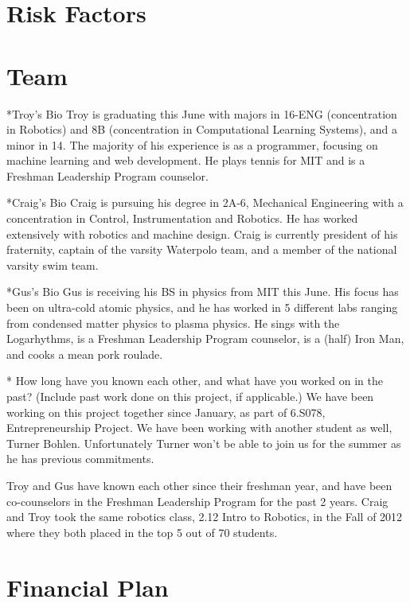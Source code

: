 \documentclass{article}
\begin{document}
\section{Risk Factors}

\section{Team}
*Troy's Bio Troy is graduating this June with majors in 16-ENG (concentration in
Robotics) and 8B (concentration in Computational Learning Systems), and a minor
in 14. The majority of his experience is as a programmer, focusing on machine
learning and web development. He plays tennis for MIT and is a Freshman
Leadership Program counselor.

*Craig's Bio Craig is pursuing his degree in 2A-6, Mechanical Engineering with a
concentration in Control, Instrumentation and Robotics. He has worked
extensively with robotics and machine design. Craig is currently president of
his fraternity, captain of the varsity Waterpolo team, and a member of the
national varsity swim team.

*Gus's Bio Gus is receiving his BS in physics from MIT this June. His focus has
been on ultra-cold atomic physics, and he has worked in 5 different labs ranging
from condensed matter physics to plasma physics. He sings with the Logarhythms,
is a Freshman Leadership Program counselor, is a (half) Iron Man, and cooks a
mean pork roulade.

* How long have you known each other, and what have you worked on in the past?
(Include past work done on this project, if applicable.) We have been working on
this project together since January, as part of 6.S078, Entrepreneurship
Project. We have been working with another student as well, Turner Bohlen.
Unfortunately Turner won't be able to join us for the summer as he has previous
commitments.

Troy and Gus have known each other since their freshman year, and have been
co-counselors in the Freshman Leadership Program for the past 2 years. Craig and
Troy took the same robotics class, 2.12 Intro to Robotics, in the Fall of 2012
where they both placed in the top 5 out of 70 students.

\section{Financial Plan}
\end{document}
